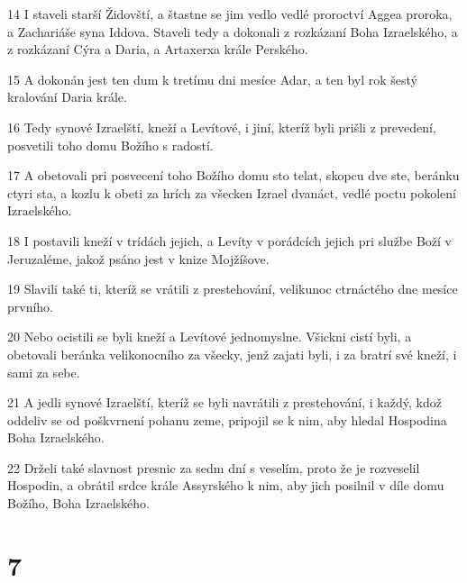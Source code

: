 \par 14 I staveli starší Židovští, a štastne se jim vedlo vedlé proroctví Aggea proroka, a Zachariáše syna Iddova. Staveli tedy a dokonali z rozkázaní Boha Izraelského, a z rozkázaní Cýra a Daria, a Artaxerxa krále Perského.
\par 15 A dokonán jest ten dum k tretímu dni mesíce Adar, a ten byl rok šestý kralování Daria krále.
\par 16 Tedy synové Izraelští, kneží a Levítové, i jiní, kteríž byli prišli z prevedení, posvetili toho domu Božího s radostí.
\par 17 A obetovali pri posvecení toho Božího domu sto telat, skopcu dve ste, beránku ctyri sta, a kozlu k obeti za hrích za všecken Izrael dvanáct, vedlé poctu pokolení Izraelského.
\par 18 I postavili kneží v trídách jejich, a Levíty v porádcích jejich pri službe Boží v Jeruzaléme, jakož psáno jest v knize Mojžíšove.
\par 19 Slavili také ti, kteríž se vrátili z prestehování, velikunoc ctrnáctého dne mesíce prvního.
\par 20 Nebo ocistili se byli kneží a Levítové jednomyslne. Všickni cistí byli, a obetovali beránka velikonocního za všecky, jenž zajati byli, i za bratrí své kneží, i sami za sebe.
\par 21 A jedli synové Izraelští, kteríž se byli navrátili z prestehování, i každý, kdož oddeliv se od poškvrnení pohanu zeme, pripojil se k nim, aby hledal Hospodina Boha Izraelského.
\par 22 Drželi také slavnost presnic za sedm dní s veselím, proto že je rozveselil Hospodin, a obrátil srdce krále Assyrského k nim, aby jich posilnil v díle domu Božího, Boha Izraelského.

\chapter{7}

